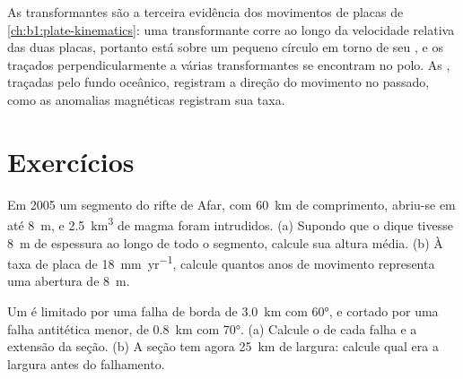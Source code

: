 \begin{omfigure}
\par{}
\label{fig:b1:rifts-ridges-margins:transform}
\end{omfigure}

As transformantes são a terceira evidência dos movimentos de placas de \cref{ch:b1:plate-kinematics}: uma transformante corre ao longo da velocidade relativa das duas placas, portanto está sobre um pequeno círculo em torno de seu , e os  traçados perpendicularmente a várias transformantes se encontram no polo.
As , traçadas pelo fundo oceânico, registram a direção do movimento no passado, como as anomalias magnéticas registram sua taxa.

\section{Exercícios}

\begin{exercise}[$\star$]\label{exo:b1:rifts-ridges-margins:1}
Em 2005 um segmento do rifte de Afar, com \qty{60}{km} de comprimento, abriu-se em até \qty{8}{m}, e \qty{2.5}{km^3} de magma foram intrudidos. (a) Supondo que o dique tivesse \qty{8}{m} de espessura ao longo de todo o segmento, calcule sua altura média. (b) À taxa de placa de \qty{18}{mm.yr^{-1}}, calcule quantos anos de movimento representa uma abertura de \qty{8}{m}.
\end{exercise}

\begin{exercise}[$\star$]\label{exo:b1:rifts-ridges-margins:2}
Um  é limitado por uma falha de borda de  \qty{3.0}{km} com 
\ang{60}, e cortado por uma falha antitética menor, de  \qty{0.8}{km} com 
\ang{70}. (a) Calcule o  de cada falha e a extensão da seção.
(b) A seção tem agora \qty{25}{km} de largura: calcule qual era a largura antes do falhamento.
\end{exercise}


